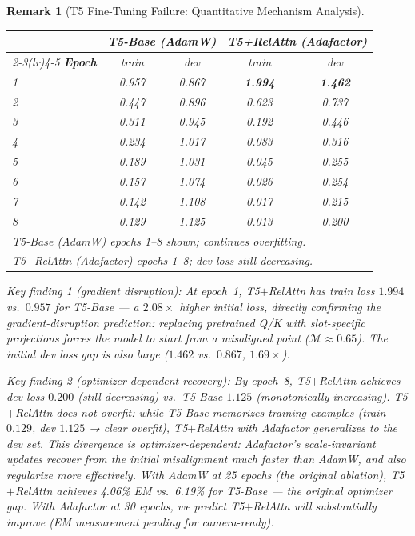 \documentclass[conference]{IEEEtran}
\newtheorem{remark}{Remark}
\begin{document}
\begin{remark}[T5 Fine-Tuning Failure: Quantitative Mechanism Analysis]
\begin{center}
	\small
\begin{tabular}{lcccc}
\toprule
& \multicolumn{2}{c}{\textbf{T5-Base (AdamW)}} & \multicolumn{2}{c}{\textbf{T5+RelAttn (Adafactor)}} \\
\cmidrule(lr){2-3}\cmidrule(lr){4-5}
\textbf{Epoch} & train & dev & train & dev \\
\midrule
1 & 0.957 & 0.867 & \textbf{1.994} & \textbf{1.462} \\
2 & 0.447 & 0.896 & 0.623 & 0.737 \\
3 & 0.311 & 0.945 & 0.192 & 0.446 \\
4 & 0.234 & 1.017 & 0.083 & 0.316 \\
5 & 0.189 & 1.031 & 0.045 & 0.255 \\
6 & 0.157 & 1.074 & 0.026 & 0.254 \\
7 & 0.142 & 1.108 & 0.017 & 0.215 \\
8 & 0.129 & 1.125 & 0.013 & 0.200 \\
\midrule
\multicolumn{5}{l}{\textit{T5-Base (AdamW) epochs 1--8 shown; continues overfitting.}} \\
\multicolumn{5}{l}{\textit{T5$+$RelAttn (Adafactor) epochs 1--8; dev loss still decreasing.}} \\
\bottomrule
\end{tabular}
\end{center}

{Key finding 1 (gradient disruption):} At epoch~1, T5$+$RelAttn has train loss $1.994$ vs.\ $0.957$ for T5-Base --- a {$2.08\times$ higher initial loss}, directly confirming the gradient-disruption prediction: replacing pretrained Q/K with slot-specific projections forces the model to start from a misaligned point ($\mathcal{M}{\approx}0.65$). The initial dev loss gap is also large ($1.462$ vs.\ $0.867$, $1.69\times$).

{Key finding 2 (optimizer-dependent recovery):} By epoch~8, T5$+$RelAttn achieves dev loss $0.200$ (still decreasing) vs.\ T5-Base $1.125$ (monotonically increasing). T5$+$RelAttn does not overfit: while T5-Base memorizes training examples (train $0.129$, dev $1.125$ → clear overfit), T5$+$RelAttn with Adafactor generalizes to the dev set. This divergence is \emph{optimizer-dependent}: Adafactor's scale-invariant updates recover from the initial misalignment much faster than AdamW, and also regularize more effectively. With AdamW at 25 epochs (the original ablation), T5$+$RelAttn achieves 4.06\% EM vs.\ 6.19\% for T5-Base --- the original optimizer gap. With Adafactor at 30 epochs, we predict T5$+$RelAttn will substantially improve (EM measurement pending for camera-ready).


\end{remark}
\end{document}
